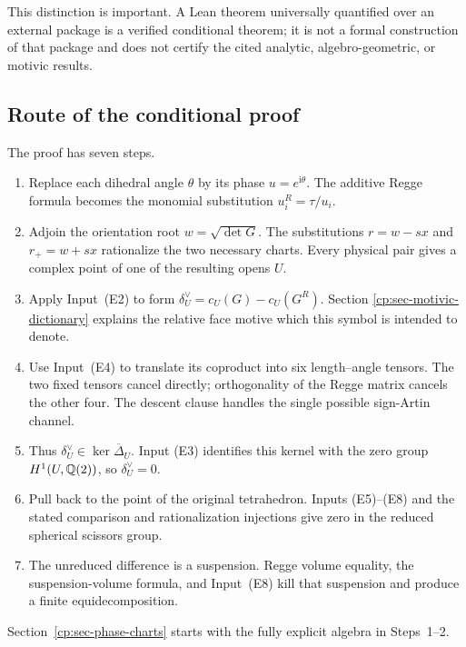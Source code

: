 This distinction is important.  A Lean theorem universally quantified over
an external package is a verified conditional theorem; it is not a formal
construction of that package and does not certify the cited analytic,
algebro-geometric, or motivic results.

\subsection{Route of the conditional proof}

The proof has seven steps.

\begin{enumerate}[label=\arabic*.,leftmargin=2.1em]
\item Replace each dihedral angle \(\theta\) by its phase
\(u=e^{\mathrm i\theta}\).  The additive Regge formula becomes the monomial
substitution \(u_i^R=\tau/u_i\).

\item Adjoin the orientation root \(w=\sqrt{\det G}\).  The substitutions
\(r=w-sx\) and \(r_+=w+sx\) rationalize the two necessary charts.  Every
physical pair gives a complex point of one of the resulting opens \(U\).

\item Apply Input~\textup{(E2)} to form
\(\delta_U^\vee=c_U(G)-c_U(G^R)\).  Section
\ref{cp:sec-motivic-dictionary} explains the relative face motive which this
symbol is intended to denote.

\item Use Input~\textup{(E4)} to translate its coproduct into six
length--angle tensors.  The two fixed tensors cancel directly; orthogonality
of the Regge matrix cancels the other four.  The descent clause handles the
single possible sign-Artin channel.

\item Thus \(\delta_U^\vee\in\ker\overline\Delta_U\).  Input
\textup{(E3)} identifies this kernel with the zero group
\(H^1(U,\mathbb Q(2))\), so \(\delta_U^\vee=0\).

\item Pull back to the point of the original tetrahedron.  Inputs
\textup{(E5)--(E8)} and the stated comparison and rationalization injections
give zero in the reduced spherical scissors group.

\item The unreduced difference is a suspension.  Regge volume equality,
the suspension-volume formula, and Input~\textup{(E8)} kill that suspension
and produce a finite equidecomposition.
\end{enumerate}

Section~\ref{cp:sec-phase-charts} starts with the fully explicit algebra in
Steps~1--2.
